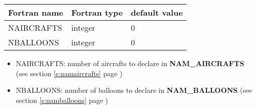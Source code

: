 \vspace{0.5cm}
\begin{longtable} {|p{}|p{}|p{}|}
\hline
Fortran name &  Fortran type & default value \\
\hline
\endhead
\hline
\endfoot
NAIRCRAFTS & integer & 0 \\
NBALLOONS  & integer & 0 \\
\end{longtable}
\begin{itemize}
\item NAIRCRAFTS: number of aircrafts to declare in \textbf{NAM\_AIRCRAFTS} (see section \ref{s:namaircrafts} page \pageref{s:namaircrafts})

\item NBALLOONS: number of balloons to declare in \textbf{NAM\_BALLOONS} (see section \ref{s:namballoons} page \pageref{s:namballoons})

\end{itemize}

